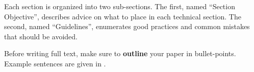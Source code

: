 Each section is organized into two sub-sections.
The first, named ``Section Objective'', describes advice on what to place in each technical section. The second, named ``Guidelines'', enumerates good practices and common mistakes that should be avoided.

Before writing full text, make sure to \textbf{outline} your paper in bullet-points.
Example sentences are given in .

